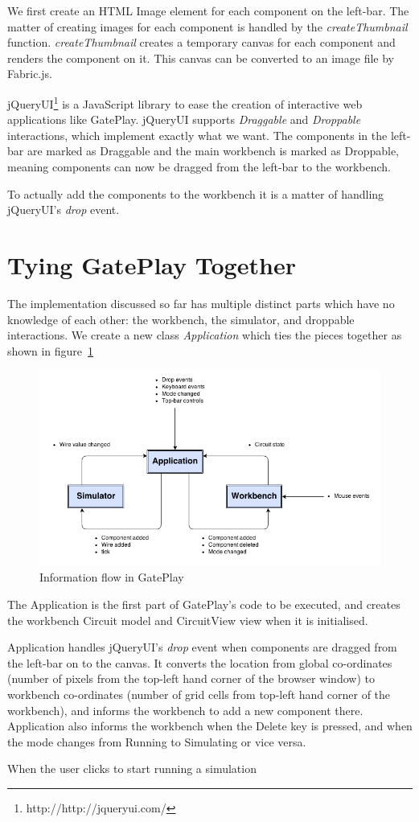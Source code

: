 We first create an HTML Image element for each component on the left-bar. The matter of creating images for each component is handled by the  \textit{createThumbnail} function. \textit{createThumbnail} creates a temporary canvas for each component and renders the component on it. This canvas can be converted to an image file by Fabric.js.

jQueryUI\footnote{http://http://jqueryui.com/} is a JavaScript library to ease the creation of interactive web applications like GatePlay. jQueryUI supports \textit{Draggable} and \textit{Droppable} interactions, which implement exactly what we want. The components in the left-bar are marked as Draggable and the main workbench is marked as Droppable, meaning components can now be dragged from the left-bar to the workbench.

To actually add the components to the workbench it is a matter of handling jQueryUI's \textit{drop} event.

\section{Tying GatePlay Together}
The implementation discussed so far has multiple distinct parts which have no knowledge of each other: the workbench, the simulator, and droppable interactions. We create a new class \textit{Application} which ties the pieces together as shown in figure~\ref{fig:application}

\begin{figure}[H]
    \centering
    \includegraphics[width=\textwidth]{application.png}
    \caption{Information flow in GatePlay}
    \label{fig:application}
\end{figure}

The Application is the first part of GatePlay's code to be executed, and creates the workbench Circuit model and CircuitView view when it is initialised.

Application handles jQueryUI's \textit{drop} event when components are dragged from the left-bar on to the canvas. It converts the location from global co-ordinates (number of pixels from the top-left hand corner of the browser window) to workbench co-ordinates (number of grid cells from top-left hand corner of the workbench), and informs the workbench to add a new component there. Application also informs the workbench when the Delete key is pressed, and when the mode changes from Running to Simulating or vice versa.

When the user clicks to start running a simulation